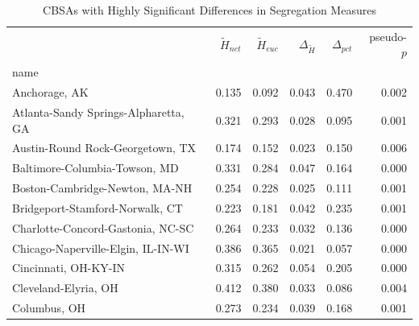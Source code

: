 \documentclass[
  10pt,
]{article}
\begin{document}
\begin{table}
\centering
\caption{CBSAs with Highly Significant Differences in Segregation Measures}
\label{one_pct_diffs}
\begin{tabular}{lrrrrr}
\toprule
{} &  $\tilde{H}_{net}$ &  $\tilde{H}_{euc}$ &  $\Delta_{\tilde{H}}$ &  $\Delta_{pct}$ &  pseudo-$p$ \\
name                                         &                    &                    &                       &                 &             \\
\midrule
Anchorage, AK                                &              0.135 &              0.092 &                 0.043 &           0.470 &       0.002 \\
Atlanta-Sandy Springs-Alpharetta, GA         &              0.321 &              0.293 &                 0.028 &           0.095 &       0.001 \\
Austin-Round Rock-Georgetown, TX             &              0.174 &              0.152 &                 0.023 &           0.150 &       0.006 \\
Baltimore-Columbia-Towson, MD                &              0.331 &              0.284 &                 0.047 &           0.164 &       0.000 \\
Boston-Cambridge-Newton, MA-NH               &              0.254 &              0.228 &                 0.025 &           0.111 &       0.001 \\
Bridgeport-Stamford-Norwalk, CT              &              0.223 &              0.181 &                 0.042 &           0.235 &       0.001 \\
Charlotte-Concord-Gastonia, NC-SC            &              0.264 &              0.233 &                 0.032 &           0.136 &       0.000 \\
Chicago-Naperville-Elgin, IL-IN-WI           &              0.386 &              0.365 &                 0.021 &           0.057 &       0.000 \\
Cincinnati, OH-KY-IN                         &              0.315 &              0.262 &                 0.054 &           0.205 &       0.000 \\
Cleveland-Elyria, OH                         &              0.412 &              0.380 &                 0.033 &           0.086 &       0.004 \\
Columbus, OH                                 &              0.273 &              0.234 &                 0.039 &           0.168 &       0.001 \\

\end{tabular}
\end{table}
\end{document}
